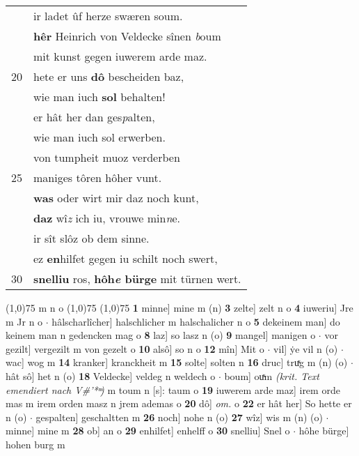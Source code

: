\documentclass[8pt,a4paper,notitlepage]{article}
\begin{document}
\begin{table}[ht]
\begin{minipage}[t]{0.5\linewidth}
\begin{tabular}{rl}
 & ir ladet ûf herze swæren soum.\\ 
 & \textbf{hêr} Heinrich von Veldecke sînen \textit{b}oum\\ 
 & mit kunst gegen iuwerem arde maz.\\ 
20 & hete er uns \textbf{dô} bescheiden baz,\\ 
 & wie man iuch \textbf{sol} behalten!\\ 
 & er hât her dan ges\textit{p}alten,\\ 
 & wie man iuch sol erwerben.\\ 
 & von tumpheit muoz verderben\\ 
25 & maniges tôren hôher vunt.\\ 
 & \textbf{was} oder wirt mir daz noch kunt,\\ 
 & \textbf{daz} wî\textit{z} ich iu, vrouwe min\textit{n}e.\\ 
 & ir sît slôz ob dem sinne.\\ 
 & ez \textbf{en}hilfet gegen iu schilt noch swert,\\ 
30 & \textbf{snelliu} ros, \textbf{hôh\textit{e} bürge} mit türnen wert.\\ 
\end{tabular}
\scriptsize
\line(1,0){75} \newline
m n o \newline
\line(1,0){75} \newline
\newline
\line(1,0){75} \newline
\textbf{1} minne] mine m (n) \textbf{3} zelte] zelt n o \textbf{4} iuweriu] Jre m Jr n o  $\cdot$ hâlscharlîcher] halschlicher m halschalicher n o \textbf{5} dekeinem man] do keinem man n gedencken mag o \textbf{8} laz] so lasz n (o) \textbf{9} mangel] manigen o  $\cdot$ vor gezilt] vergezilt m von gezelt o \textbf{10} alsô] so n o \textbf{12} mîn] Mit o  $\cdot$ vil] ẏe vil n (o)  $\cdot$ wac] wog m \textbf{14} kranker] kranckheit m \textbf{15} solte] solten n \textbf{16} druc] truͯg m (n) (o)  $\cdot$ hât sô] het n (o) \textbf{18} Veldecke] veldeg n weldech o  $\cdot$ boum] ouͯm \textit{(krit. Text emendiert nach V#'* ͫ)} m toum n [s]: taum o \textbf{19} iuwerem arde maz] irem orde mas m irem orden masz n jrem ademas o \textbf{20} dô] \textit{om.} o \textbf{22} er hât her] So hette er n (o)  $\cdot$ gespalten] geschaltten m \textbf{26} noch] nohe n (o) \textbf{27} wîz] wis m (n) (o)  $\cdot$ minne] mine m \textbf{28} ob] an o \textbf{29} enhilfet] enhelff o \textbf{30} snelliu] Snel o  $\cdot$ hôhe bürge] hohen burg m \newline
\end{minipage}
\end{table}
\end{document}
